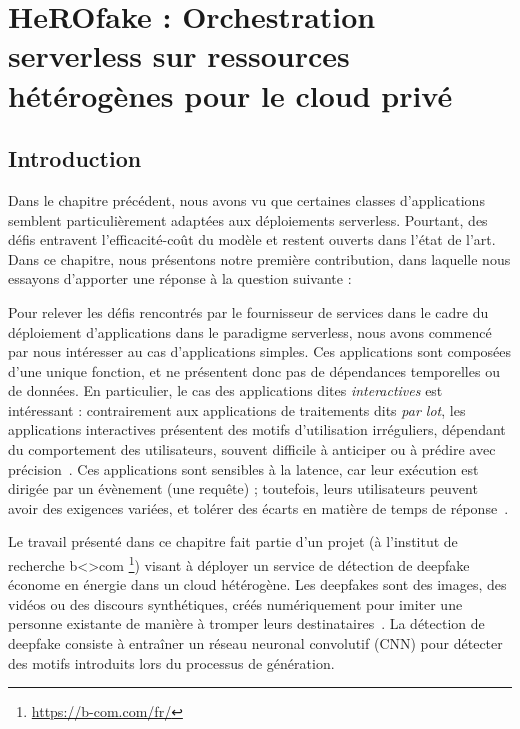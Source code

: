 \chapter{HeROfake : Orchestration serverless sur ressources hétérogènes pour le cloud privé}
\label{chapter:herofake}

\section{Introduction}
\label{section:herofake-introduction}

Dans le chapitre précédent, nous avons vu que certaines classes d'applications semblent particulièrement adaptées aux déploiements serverless. Pourtant, des défis entravent l'efficacité-coût du modèle et restent ouverts dans l'état de l'art. Dans ce chapitre, nous présentons notre première contribution, dans laquelle nous essayons d'apporter une réponse à la question suivante : 


Pour relever les défis rencontrés par le fournisseur de services dans le cadre du déploiement d'applications dans le paradigme serverless, nous avons commencé par nous intéresser au cas d'applications simples. Ces applications sont composées d'une unique fonction, et ne présentent donc pas de dépendances temporelles ou de données. En particulier, le cas des applications dites \textit{interactives} est intéressant : contrairement aux applications de traitements dits \textit{par lot}, les applications interactives présentent des motifs d'utilisation irréguliers, dépendant du comportement des utilisateurs, souvent difficile à anticiper ou à prédire avec précision~\cite{shahradServerlessWildCharacterizing, cncf2018whitepaper}. Ces applications sont sensibles à la latence, car leur exécution est dirigée par un évènement (une requête) ; toutefois, leurs utilisateurs peuvent avoir des exigences variées, et tolérer des écarts en matière de temps de réponse~\cite{buyyaSLAorientedResourceProvisioning2011}.

Le travail présenté dans ce chapitre fait partie d'un projet (à l'institut de recherche b{\textless\textgreater}com \footnote{\href{https://b-com.com/fr/}{https://b-com.com/fr/}}) visant à déployer un service de détection de deepfake économe en énergie dans un cloud hétérogène. Les deepfakes sont des images, des vidéos ou des discours synthétiques, créés numériquement pour imiter une personne existante de manière à tromper leurs destinataires~\cite{westerlundEmergenceDeepfakeTechnology2019}. La détection de deepfake consiste à entraîner un réseau neuronal convolutif (\gls{CNN}) pour détecter des motifs introduits lors du processus de génération.

